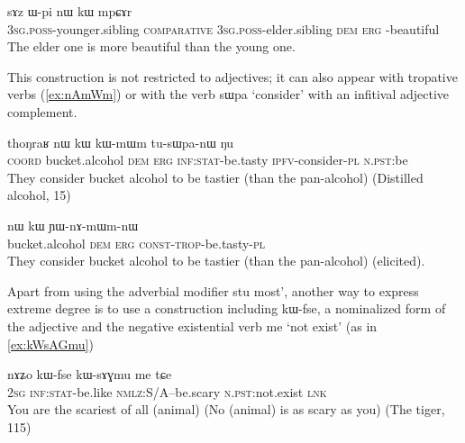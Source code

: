 \documentclass[oldfontcommands,oneside,a4paper,11pt]{article}
\newcommand{\ipa}[1]{{\phon \mbox{#1}}} %
\begin{document}
\begin{exe}
\ex \label{ex:comp1}
\gll  \ipa{ɯ-ʁi}   	\ipa{sɤz}   	\ipa{ɯ-pi}   	\ipa{nɯ}   	\ipa{kɯ}   	\ipa{mpɕɤr}     \\
\textsc{3sg.poss}-younger.sibling \textsc{comparative} \textsc{3sg.poss}-elder.sibling \textsc{dem} \textsc{erg} -beautiful \\
\glt The elder one is more beautiful than the young one.
\end{exe}

This construction is not restricted to adjectives; it can also appear with tropative verbs (\ref{ex:nAmWm}) or with the verb \ipa{sɯpa} `consider' with an infitival adjective complement.
 
\begin{exe}
\ex \label{ex:kWkWmWm}
\gll  \ipa{tɕe}   	\ipa{thoŋraʁ}   	\ipa{nɯ}   	\ipa{kɯ}   	\ipa{kɯ-mɯm}   	\ipa{tu-sɯpa-nɯ}   	\ipa{ŋu}   \\
\textsc{coord} bucket.alcohol \textsc{dem} \textsc{erg} \textsc{inf:stat}-be.tasty \textsc{ipfv}-consider-\textsc{pl} \textsc{n.pst}:be \\
\glt They consider  bucket alcohol to be tastier (than the pan-alcohol) (Distilled alcohol, 15)
\end{exe}

\begin{exe}
\ex \label{ex:nAmWm}
\gll  \ipa{thoŋraʁ} 	\ipa{nɯ} 	\ipa{kɯ} 	\ipa{ɲɯ-nɤ-mɯm-nɯ} \\
 bucket.alcohol \textsc{dem} \textsc{erg}  \textsc{const-trop}-be.tasty-\textsc{pl} \\
 \glt They consider  bucket alcohol to be tastier (than the pan-alcohol)  (elicited).
\end{exe}
 Apart from using the adverbial modifier \ipa{stu}  most', another way to express extreme degree is to use a construction including \ipa{kɯ-fse}, a nominalized form of the adjective and the negative existential verb \ipa{me} `not exist' (as in \ref{ex:kWsAGmu})
 
 \begin{exe}
\ex \label{ex:kWsAGmu}
\gll 
\ipa{nɤʑo} 	\ipa{kɯ-fse} 	\ipa{kɯ-sɤɣmu} 	\ipa{me} 	\ipa{tɕe} 		\\
\textsc{2sg} \textsc{inf:stat}-be.like \textsc{nmlz}:S/A--be.scary \textsc{n.pst}:not.exist \textsc{lnk} \\
\glt You are the scariest of all (animal) (No (animal) is as scary as you) (The tiger, 115)
 \end{exe}
 
\end{document}
